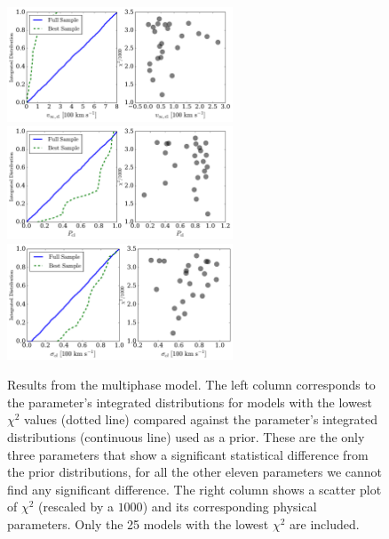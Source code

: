 \documentclass[a4,useAMS,usenatbib,usegraphicx]{mn2e}
\begin{document}
\begin{figure}
\begin{center}
  \includegraphics[width=0.6\textwidth]{vinf_cl.pdf}
  \includegraphics[width=0.6\textwidth]{P_cl.pdf}
  \includegraphics[width=0.6\textwidth]{sigma_cl.pdf}
\caption{Results from the multiphase
  model.
  The left column corresponds to the parameter's integrated distributions for
  models with the lowest $\chi^2$ values (dotted line) compared against the
  parameter's integrated distributions (continuous line) used as a prior.
  These are the only three parameters that show a significant statistical difference from
  the prior distributions, for all the other eleven parameters we
  cannot find any significant difference.
  The right column shows a scatter plot of $\chi^2$ (rescaled by a $1000$)
  and its corresponding physical parameters.
  Only the  25 models with the lowest $\chi^2$ are included.
  \label{multiphaseresults}
}  
\end{center}
\end{figure}
\end{document}
